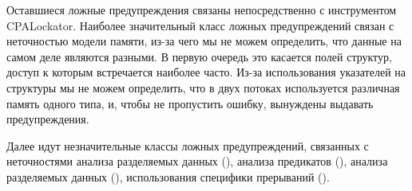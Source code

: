 Оставшиеся ложные предупреждения связаны непосредственно с инструментом CPALockator.
Наиболее значительный класс ложных предупреждений связан с неточностью модели памяти, из-за чего мы не можем определить, что данные на самом деле являются разными.
В первую очередь это касается полей структур, доступ к которым встречается наиболее часто.
Из-за использования указателей на структуры мы не можем определить, что в двух потоках используется различная память одного типа, и, чтобы не пропустить ошибку, вынуждены выдавать предупреждения.

Далее идут незначительные классы ложных предупреждений, связанных с неточностями анализа разделяемых данных (), анализа предикатов (), анализа разделяемых данных (), использования специфики прерываний ().


%
%
%

